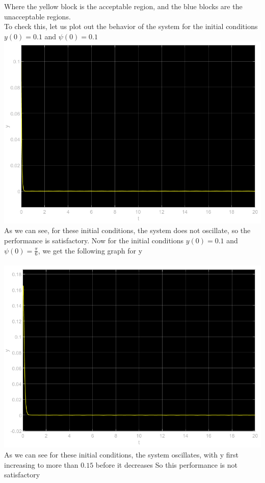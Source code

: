 \documentclass[12pt]{article}
\begin{document}
Where the yellow block is the acceptable region, and the blue blocks are the unacceptable regions.\\
To check this, let us plot out the behavior of the system for the initial conditions $y(0)=0.1$ and $\psi(0)=0.1$\\
\includegraphics[scale=0.4]{Problem3Fig2.png}\\
As we can see, for these initial conditions, the system does not oscillate, so the performance is satisfactory. 
Now for the initial conditions $y(0)=0.1$ and $\psi(0)=\frac{\pi}{6}$, we get the following graph for y\\
\\\includegraphics[scale=0.4]{Problem3Fig3.png}\\
As we can see for these initial conditions, the system oscillates, with y first increasing to more than $0.15$ before it decreases
So this performance is not satisfactory
\end{document}
